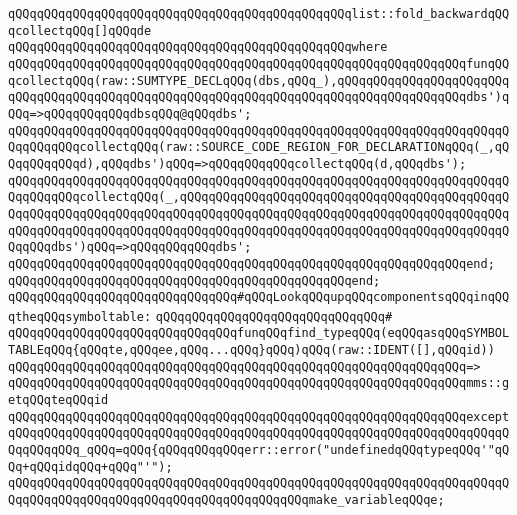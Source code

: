 \verb|qQQqqQQqqQQqqQQqqQQqqQQqqQQqqQQqqQQqqQQqqQQqqQQqlist::fold_backwardqQQqcollectqQQq[]qQQqde|\newline
\verb|qQQqqQQqqQQqqQQqqQQqqQQqqQQqqQQqqQQqqQQqqQQqqQQqwhere|\newline
\verb|qQQqqQQqqQQqqQQqqQQqqQQqqQQqqQQqqQQqqQQqqQQqqQQqqQQqqQQqqQQqqQQqfunqQQqcollectqQQq(raw::SUMTYPE_DECLqQQq(dbs,qQQq_),qQQqqQQqqQQqqQQqqQQqqQQqqQQqqQQqqQQqqQQqqQQqqQQqqQQqqQQqqQQqqQQqqQQqqQQqqQQqqQQqqQQqqQQqdbs')qQQq=>qQQqqQQqqQQqdbsqQQq@qQQqdbs';|\newline
\verb|qQQqqQQqqQQqqQQqqQQqqQQqqQQqqQQqqQQqqQQqqQQqqQQqqQQqqQQqqQQqqQQqqQQqqQQqqQQqqQQqcollectqQQq(raw::SOURCE_CODE_REGION_FOR_DECLARATIONqQQq(_,qQQqqQQqqQQqd),qQQqdbs')qQQq=>qQQqqQQqqQQqcollectqQQq(d,qQQqdbs');|\newline
\verb|qQQqqQQqqQQqqQQqqQQqqQQqqQQqqQQqqQQqqQQqqQQqqQQqqQQqqQQqqQQqqQQqqQQqqQQqqQQqqQQqcollectqQQq(_,qQQqqQQqqQQqqQQqqQQqqQQqqQQqqQQqqQQqqQQqqQQqqQQqqQQqqQQqqQQqqQQqqQQqqQQqqQQqqQQqqQQqqQQqqQQqqQQqqQQqqQQqqQQqqQQqqQQqqQQqqQQqqQQqqQQqqQQqqQQqqQQqqQQqqQQqqQQqqQQqqQQqqQQqqQQqqQQqqQQqqQQqqQQqqQQqdbs')qQQq=>qQQqqQQqqQQqdbs';|\newline
\verb|qQQqqQQqqQQqqQQqqQQqqQQqqQQqqQQqqQQqqQQqqQQqqQQqqQQqqQQqqQQqqQQqend;|\newline
\verb|qQQqqQQqqQQqqQQqqQQqqQQqqQQqqQQqqQQqqQQqqQQqqQQqend;|\newline
\newline
\newline
\verb|qQQqqQQqqQQqqQQqqQQqqQQqqQQqqQQq#qQQqLookqQQqupqQQqcomponentsqQQqinqQQqtheqQQqsymboltable:|\newline
\verb|qQQqqQQqqQQqqQQqqQQqqQQqqQQqqQQq#|\newline
\verb|qQQqqQQqqQQqqQQqqQQqqQQqqQQqqQQqfunqQQqfind_typeqQQq(eqQQqasqQQqSYMBOLTABLEqQQq{qQQqte,qQQqee,qQQq...qQQq}qQQq)qQQq(raw::IDENT([],qQQqid))|\newline
\verb|qQQqqQQqqQQqqQQqqQQqqQQqqQQqqQQqqQQqqQQqqQQqqQQqqQQqqQQqqQQqqQQq=>|\newline
\verb|qQQqqQQqqQQqqQQqqQQqqQQqqQQqqQQqqQQqqQQqqQQqqQQqqQQqqQQqqQQqqQQqmms::getqQQqteqQQqid|\newline
\verb|qQQqqQQqqQQqqQQqqQQqqQQqqQQqqQQqqQQqqQQqqQQqqQQqqQQqqQQqqQQqqQQqexcept|\newline
\verb|qQQqqQQqqQQqqQQqqQQqqQQqqQQqqQQqqQQqqQQqqQQqqQQqqQQqqQQqqQQqqQQqqQQqqQQqqQQqqQQq_qQQq=qQQq{qQQqqQQqqQQqerr::error("undefinedqQQqtypeqQQq'"qQQq+qQQqidqQQq+qQQq"'");|\newline
\verb|qQQqqQQqqQQqqQQqqQQqqQQqqQQqqQQqqQQqqQQqqQQqqQQqqQQqqQQqqQQqqQQqqQQqqQQqqQQqqQQqqQQqqQQqqQQqqQQqqQQqqQQqqQQqqQQqmake_variableqQQqe;|\newline
